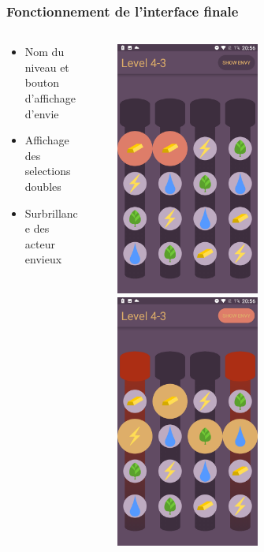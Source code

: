 \documentclass{beamer}
\begin{document}
\begin{frame}
\frametitle{Fonctionnement de l'interface finale}
\begin{columns}
\begin{column}{0.45\textwidth}
   \begin{itemize}
	\item Nom du niveau et bouton d'affichage d'envie
    \item Affichage des selections doubles  
    \item Surbrillance des acteur envieux  
\end{itemize}
\end{column}~
\begin{column}{0.49\textwidth}
    \begin{center}
     \includegraphics[width=0.49\textwidth]{g2}
     ~
     \includegraphics[width=0.49\textwidth]{g3}   
     \end{center}
\end{column}
\end{columns}
\end{frame}
\end{document}
